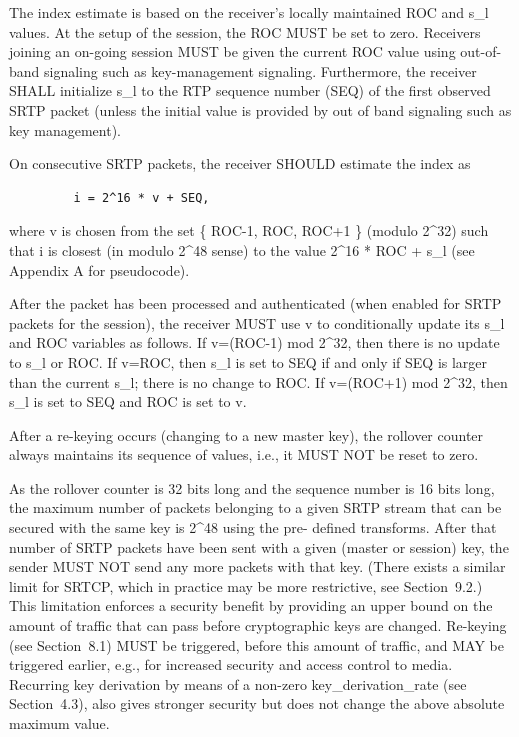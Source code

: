\documentclass{article}
\begin{document}
The index estimate is based on the receiver's locally maintained ROC and s\_l values.  At the setup of the session, the ROC MUST be set to zero.  Receivers joining an on-going session MUST be given the current ROC value using out-of-band signaling such as key-management signaling.  Furthermore, the receiver SHALL initialize s\_l to the RTP sequence number (SEQ) of the first observed SRTP packet (unless the initial value is provided by out of band signaling such as key management).

On consecutive SRTP packets, the receiver SHOULD estimate the index as

\begin{verbatim}
         i = 2^16 * v + SEQ,
\end{verbatim}

where v is chosen from the set \{ ROC-1, ROC, ROC+1 \} (modulo 2\textasciicircum{}32) such that i is closest (in modulo 2\textasciicircum{}48 sense) to the value 2\textasciicircum{}16 * ROC + s\_l (see Appendix A for pseudocode).

After the packet has been processed and authenticated (when enabled for SRTP packets for the session), the receiver MUST use v to conditionally update its s\_l and ROC variables as follows.  If v=(ROC-1) mod 2\textasciicircum{}32, then there is no update to s\_l or ROC.  If v=ROC, then s\_l is set to SEQ if and only if SEQ is larger than the current s\_l; there is no change to ROC.  If v=(ROC+1) mod 2\textasciicircum{}32, then s\_l is set to SEQ and ROC is set to v.

After a re-keying occurs (changing to a new master key), the rollover counter always maintains its sequence of values, i.e., it MUST NOT be reset to zero.

As the rollover counter is 32 bits long and the sequence number is 16 bits long, the maximum number of packets belonging to a given SRTP stream that can be secured with the same key is 2\textasciicircum{}48 using the pre- defined transforms.  After that number of SRTP packets have been sent with a given (master or session) key, the sender MUST NOT send any more packets with that key.  (There exists a similar limit for SRTCP, which in practice may be more restrictive, see Section~9.2.)  This limitation enforces a security benefit by providing an upper bound on the amount of traffic that can pass before cryptographic keys are changed.  Re-keying (see Section~8.1) MUST be triggered, before this amount of traffic, and MAY be triggered earlier, e.g., for increased security and access control to media.  Recurring key derivation by means of a non-zero key\_derivation\_rate (see Section~4.3), also gives stronger security but does not change the above absolute maximum value.
\end{document}
